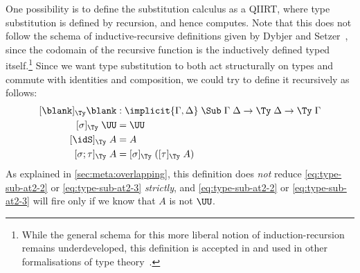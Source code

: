 \documentclass[a4paper,UKenglish,numberwithinsect,cleveref,thm-restate]{lipics-v2021}
\begin{document}
One possibility is to define the substitution calculus as a QIIRT, where type substitution is defined by recursion, and hence computes.
Note that this does not follow the schema of inductive-recursive definitions given by Dybjer and Setzer~\cite{Dybjer2000,Dybjer2003}, since the codomain of the recursive function is the inductively defined typed itself.\footnote{%
  While the general schema for this more liberal notion of induction-recursion remains underdeveloped, this definition is accepted in \Agda and used in other formalisations of type theory~\cite{Danielsson2006}.}
%
Since we want type substitution to both act structurally on types and commute with identities and composition, we could try to define it recursively as follows:
\begin{alignat}{3}
[\blank]_{\Ty} \blank &: \implicit{\Gamma, \Delta} \; \Sub\;\Gamma\;\Delta \to \Ty\;\Delta \to \Ty\;\Gamma \nonumber \\
[ \sigma ]_{\Ty}       \;\UU  & = \UU                                   \label{eq:type-sub-at2-1} \\
[ \idS ]_{\Ty}         \;A    & = A                                     \label{eq:type-sub-at2-2} \\
[ \sigma ; \tau ]_{\Ty}\;A    & = [ \sigma ]_{\Ty}\;([ \tau ]_{\Ty}\;A) \label{eq:type-sub-at2-3}
\end{alignat}
As explained in \cref{sec:meta:overlapping}, this definition does \emph{not} reduce \eqref{eq:type-sub-at2-2} or \eqref{eq:type-sub-at2-3} \emph{strictly}, and \eqref{eq:type-sub-at2-2} or \eqref{eq:type-sub-at2-3} will fire only if we know that $A$ is not $\UU$.
\end{document}
